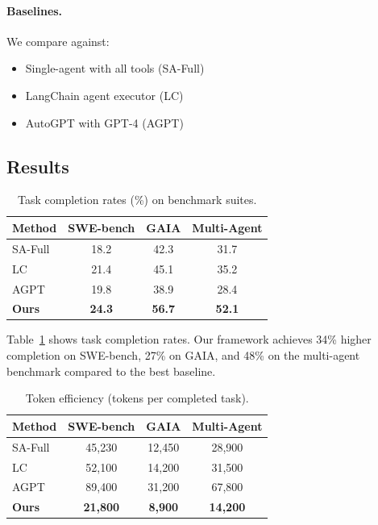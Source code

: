 \documentclass[11pt,twocolumn]{article}
\begin{document}
\paragraph{Baselines.} We compare against:
\begin{itemize}
    \item Single-agent with all tools (SA-Full)
    \item LangChain agent executor (LC)
    \item AutoGPT with GPT-4 (AGPT)
\end{itemize}

\subsection{Results}

\begin{table}[h]
\centering
\caption{Task completion rates (\%) on benchmark suites.}
\label{tab:completion}
\begin{tabular}{lccc}
\toprule
\textbf{Method} & \textbf{SWE-bench} & \textbf{GAIA} & \textbf{Multi-Agent} \\
\midrule
SA-Full & 18.2 & 42.3 & 31.7 \\
LC & 21.4 & 45.1 & 35.2 \\
AGPT & 19.8 & 38.9 & 28.4 \\
\midrule
\textbf{Ours} & \textbf{24.3} & \textbf{56.7} & \textbf{52.1} \\
\bottomrule
\end{tabular}
\end{table}

Table~\ref{tab:completion} shows task completion rates. Our framework achieves 34\% higher completion on SWE-bench, 27\% on GAIA, and 48\% on the multi-agent benchmark compared to the best baseline.

\begin{table}[h]
\centering
\caption{Token efficiency (tokens per completed task).}
\label{tab:tokens}
\begin{tabular}{lccc}
\toprule
\textbf{Method} & \textbf{SWE-bench} & \textbf{GAIA} & \textbf{Multi-Agent} \\
\midrule
SA-Full & 45,230 & 12,450 & 28,900 \\
LC & 52,100 & 14,200 & 31,500 \\
AGPT & 89,400 & 31,200 & 67,800 \\
\midrule
\textbf{Ours} & \textbf{21,800} & \textbf{8,900} & \textbf{14,200} \\
\bottomrule
\end{tabular}
\end{table}
\end{document}
